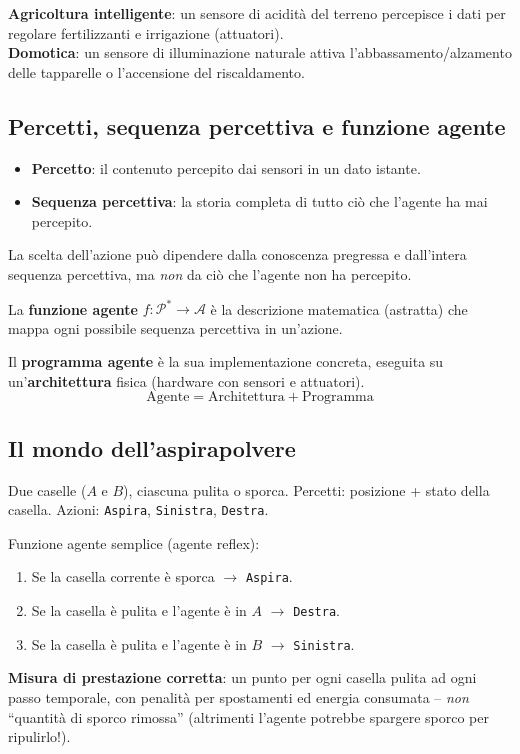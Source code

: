 \begin{exbox}
\textbf{Agricoltura intelligente}: un sensore di acidità del terreno percepisce i dati per regolare fertilizzanti e irrigazione (attuatori).\\[4pt]
\textbf{Domotica}: un sensore di illuminazione naturale attiva l'abbassamento/alzamento delle tapparelle o l'accensione del riscaldamento.
\end{exbox}


\subsection{Percetti, sequenza percettiva e funzione agente}
\begin{itemize}
    \item \textbf{Percetto}: il contenuto percepito dai sensori in un dato istante.
    \item \textbf{Sequenza percettiva}: la storia completa di tutto ciò che l'agente ha mai percepito.
\end{itemize}

La scelta dell'azione può dipendere dalla conoscenza pregressa e dall'intera sequenza percettiva, ma \emph{non} da ciò che l'agente non ha percepito.

\begin{defbox}
La \textbf{funzione agente} $f : \mathcal{P}^* \to \mathcal{A}$ è la descrizione matematica (astratta) che mappa ogni possibile sequenza percettiva in un'azione.

Il \textbf{programma agente} è la sua implementazione concreta, eseguita su un'\textbf{architettura} fisica (hardware con sensori e attuatori).
\[
\boxed{\text{Agente} = \text{Architettura} + \text{Programma}}
\]
\end{defbox}

\subsection{Il mondo dell'aspirapolvere}
\begin{exbox}
Due caselle ($A$ e $B$), ciascuna pulita o sporca. Percetti: posizione + stato della casella. Azioni: \texttt{Aspira}, \texttt{Sinistra}, \texttt{Destra}.

Funzione agente semplice (agente reflex):
\begin{enumerate}
    \item Se la casella corrente è sporca $\to$ \texttt{Aspira}.
    \item Se la casella è pulita e l'agente è in $A$ $\to$ \texttt{Destra}.
    \item Se la casella è pulita e l'agente è in $B$ $\to$ \texttt{Sinistra}.
\end{enumerate}

\textbf{Misura di prestazione corretta}: un punto per ogni casella pulita ad ogni passo temporale, con penalità per spostamenti ed energia consumata -- \emph{non} ``quantità di sporco rimossa'' (altrimenti l'agente potrebbe spargere sporco per ripulirlo!).
\end{exbox}

